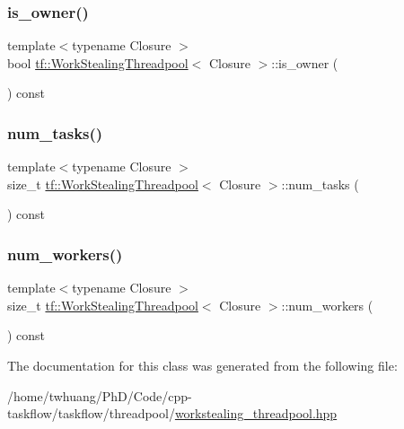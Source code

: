 \subsubsection{\texorpdfstring{is\+\_\+owner()}{is\_owner()}}
{\footnotesize\ttfamily template$<$typename Closure $>$ \\
bool \hyperlink{classtf_1_1WorkStealingThreadpool}{tf\+::\+Work\+Stealing\+Threadpool}$<$ Closure $>$\+::is\+\_\+owner (\begin{DoxyParamCaption}{ }\end{DoxyParamCaption}) const}

\mbox{\label{classtf_1_1WorkStealingThreadpool_a8fab9139bf428a30f0be2b459f7a82ce}} 
\subsubsection{\texorpdfstring{num\+\_\+tasks()}{num\_tasks()}}
{\footnotesize\ttfamily template$<$typename Closure $>$ \\
size\+\_\+t \hyperlink{classtf_1_1WorkStealingThreadpool}{tf\+::\+Work\+Stealing\+Threadpool}$<$ Closure $>$\+::num\+\_\+tasks (\begin{DoxyParamCaption}{ }\end{DoxyParamCaption}) const}

\mbox{\label{classtf_1_1WorkStealingThreadpool_a0069de0539feee6c7b211662211a81cc}} 
\subsubsection{\texorpdfstring{num\+\_\+workers()}{num\_workers()}}
{\footnotesize\ttfamily template$<$typename Closure $>$ \\
size\+\_\+t \hyperlink{classtf_1_1WorkStealingThreadpool}{tf\+::\+Work\+Stealing\+Threadpool}$<$ Closure $>$\+::num\+\_\+workers (\begin{DoxyParamCaption}{ }\end{DoxyParamCaption}) const}



The documentation for this class was generated from the following file\+:\begin{DoxyCompactItemize}
\item 
/home/twhuang/\+Ph\+D/\+Code/cpp-\/taskflow/taskflow/threadpool/\hyperlink{workstealing__threadpool_8hpp}{workstealing\+\_\+threadpool.\+hpp}\end{DoxyCompactItemize}
